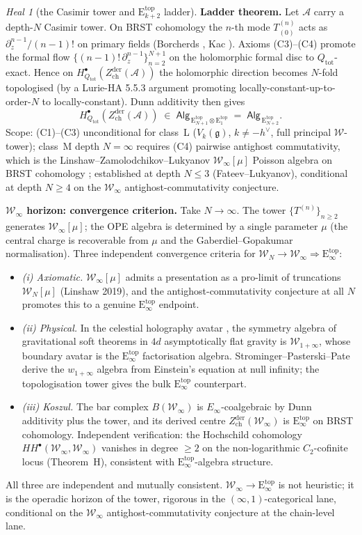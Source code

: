 \documentclass{article}
\theoremstyle{definition}
\theoremstyle{remark}
\newtheorem{heal}[theorem]{Heal}
\newcommand{\Zder}{Z^{\mathrm{der}}_{\mathrm{ch}}}
\newcommand{\Etop}[1]{\mathrm{E}_{#1}^{\mathrm{top}}}
\newcommand{\fg}{\mathfrak{g}}
\newcommand{\cW}{\mathcal{W}}
\newcommand{\cA}{\mathcal{A}}
\newcommand{\hv}{h^{\vee}}
\begin{document}
\begin{heal}[the Casimir tower and $\Etop{k+2}$ ladder]
\textbf{Ladder theorem.} Let $\cA$ carry a depth-$N$ Casimir tower.
On BRST cohomology the $n$-th mode $T^{(n)}_{(0)}$ acts as
$\partial_z^{n-1}/(n-1)!$ on primary fields (Borcherds
\cite{Borcherds-vertex}, Kac \cite{Kac-vertex}). Axioms (C3)--(C4)
promote the formal flow $\{(n-1)!\,\partial_z^{n-1}\}_{n=2}^{N+1}$ on
the holomorphic formal disc to $Q_{\mathrm{tot}}$-exact. Hence on
$H^{\bullet}_{Q_{\mathrm{tot}}}(\Zder(\cA))$ the holomorphic
direction becomes $N$-fold topologised (by a Lurie-HA 5.5.3 argument
promoting locally-constant-up-to-order-$N$ to locally-constant).
Dunn additivity then gives
\[
 H^{\bullet}_{Q_{\mathrm{tot}}}(\Zder(\cA))
 \;\in\;\mathsf{Alg}_{\,\Etop{N+1}\otimes\Etop{1}}
 \;=\;\mathsf{Alg}_{\,\Etop{N+2}}.
\]
Scope: (C1)--(C3) unconditional for class~L ($V_k(\fg)$,
$k\neq -\hv$, full principal $\cW$-tower); class~M depth $N = \infty$
requires (C4) pairwise antighost commutativity, which is the
Linshaw--Zamolodchikov--Lukyanov $\cW_\infty[\mu]$ Poisson algebra on
BRST cohomology \cite{Linshaw-Winfty}; established at depth $N \leq 3$
(Fateev--Lukyanov), conditional at depth $N \geq 4$ on the
$\cW_\infty$ antighost-commutativity conjecture.

\textbf{$\cW_\infty$ horizon: convergence criterion.}
Take $N \to \infty$. The tower $\{T^{(n)}\}_{n\geq 2}$ generates
$\cW_\infty[\mu]$; the OPE algebra is determined by a single
parameter $\mu$ (the central charge is recoverable from $\mu$ and
the Gaberdiel--Gopakumar normalisation). Three independent
convergence criteria for $\cW_N \to \cW_\infty \Rightarrow
\Etop{\infty}$:
\begin{itemize}
\item \emph{(i) Axiomatic.} $\cW_\infty[\mu]$ admits a presentation
as a pro-limit of truncations $\cW_N[\mu]$ (Linshaw 2019), and
the antighost-commutativity conjecture at all $N$ promotes this
to a genuine $\Etop{\infty}$ endpoint.
\item \emph{(ii) Physical.} In the celestial holography avatar
\cite{Strominger-celestial}, the symmetry algebra of gravitational
soft theorems in $4d$ asymptotically flat gravity is
$\cW_{1+\infty}$, whose boundary avatar is the $\Etop{\infty}$
factorisation algebra. Strominger--Pasterski--Pate derive the
$w_{1+\infty}$ algebra from Einstein's equation at null infinity;
the topologisation tower gives the bulk $\Etop{\infty}$
counterpart.
\item \emph{(iii) Koszul.} The bar complex $B(\cW_\infty)$ is
$E_\infty$-coalgebraic by Dunn additivity plus the tower, and its
derived centre $\Zder(\cW_\infty)$ is $\Etop{\infty}$ on BRST
cohomology. Independent verification: the Hochschild cohomology
$HH^{\bullet}(\cW_\infty, \cW_\infty)$ vanishes in degree
$\geq 2$ on the non-logarithmic $C_2$-cofinite locus (Theorem~H),
consistent with $\Etop{\infty}$-algebra structure.
\end{itemize}
All three are independent and mutually consistent. $\cW_\infty \to
\Etop{\infty}$ is not heuristic; it is the operadic horizon of the
tower, rigorous in the $(\infty,1)$-categorical lane, conditional
on the $\cW_\infty$ antighost-commutativity conjecture at the
chain-level lane.
\end{heal}
\end{document}
